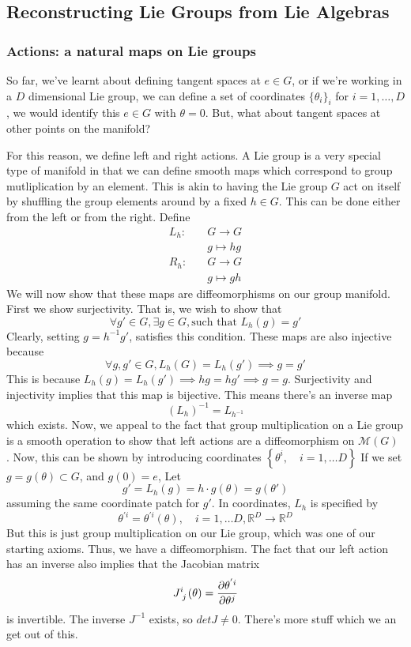 \subsection{Reconstructing Lie Groups from Lie Algebras} 

\subsubsection{Actions: a natural maps on Lie groups} 
So far, we've learnt about defining tangent spaces at $e \in G$, or if we're working in a $D$ dimensional Lie group, we can define a set of coordinates $\{ \theta_i \}_i$ for $i = 1, \dots, D$, we would identify this $e \in G$ with $\theta = 0$. But, what about tangent spaces at other points on the manifold?

For this reason, we define left and right actions. A Lie group is a very special type 
of manifold in that we
can define smooth maps which 
correspond to group mutliplication by an element. 
This is akin to having the Lie group $G$ act on itself by shuffling the group elements around by a fixed $h \in G$. This can be done either from the left or from the right. Define 
\begin{align*} 
	L_h: \quad & G \rightarrow G \\
	&	g \mapsto hg \\
	R_h: \quad & G \rightarrow G \\
	& g \mapsto gh
\end{align*}
We will now show that these maps are diffeomorphisms on our group manifold. 
First we show surjectivity. That is, we wish to show that 
\[
	\forall g' \in G, \exists g \in G , \text{such that } L_h ( g )  = g'  
\] Clearly, setting $ g = h ^ { -1 } g '$, satisfies this condition. 
These maps are also injective because
 \[
 \forall g , g' \in G, L_h( G ) = L _ h  ( g' ) \implies g = g' 
\] This is because $ L_h ( g) = L _ h ( g ' ) \implies hg = hg' \implies g = g $. 
Surjectivity and injectivity implies that this map is bijective. This means there's
an inverse map 
 \[
	 ( L _ h ) ^ { - 1}  = L _{ h ^ { - 1} }
\] which exists. Now, we appeal to the fact 
that group multiplication on a Lie group is a smooth operation 
to show that left actions are a diffeomorphism on $ \mathcal{ M }( G  ) $ . 
Now, this can be shown by introducing coordinates $ \left\{  \theta ^ i, \quad i = 1 , \dots D   \right\}  $ 
If we set $ g = g ( \theta ) \subset G $, and $ g ( 0 ) = e $, 
Let 
 \[
	 g ' = L_h ( g ) = h \cdot  g ( \theta ) = g ( \theta' ) 
\] assuming the same coordinate patch for $ g ' $. 
In coordinates,  $ L_ h$ is specified by
\[
	\theta^{ ' i  } = \theta ^{ 'i } ( \theta) , \quad i = 1, \dots D , \mathbb{ R} ^ D \to \mathbb{ R} ^  D
\] But this is just group multiplication 
on our Lie group, which was one of our starting 
axioms. Thus, we have a diffeomorphism. 
The fact that our left action has an inverse also implies 
that the Jacobian matrix 
\[
J \indices{ ^ i _ j } ( \theta)  = \frac{\partial \theta ^{ ' i } }{\partial \theta ^  j }  
\] is invertible. The inverse $ J ^ { -1 } $ exists, so $ det J \neq 0 $. 
There's more stuff which we an get out of this. 

